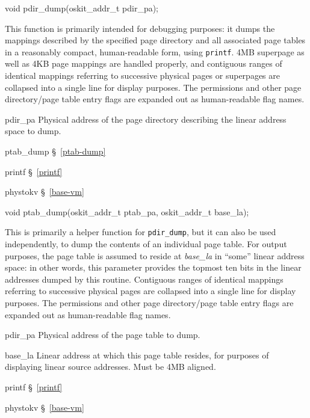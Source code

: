 \label{pdir-dump}
\begin{apisyn}

	\funcproto void pdir_dump(oskit_addr_t pdir_pa);
\end{apisyn}
\begin{apidesc}
	This function is primarily intended for debugging purposes:
	it dumps the mappings described by the specified page directory
	and all associated page tables
	in a reasonably compact, human-readable form,
	using {\tt printf}.
	4MB superpage as well as 4KB page mappings are handled properly,
	and contiguous ranges of identical mappings
	referring to successive physical pages or superpages
	are collapsed into a single line for display purposes.
	The permissions and other page directory/page table entry flags
	are expanded out as human-readable flag names.
\end{apidesc}
\begin{apiparm}
	\item[pdir_pa]
		Physical address of the page directory
		describing the linear address space to dump.
\end{apiparm}
\begin{apidep}
	\item[ptab_dump]	\S~\ref{ptab-dump}
	\item[printf]		\S~\ref{printf}
	\item[phystokv]		\S~\ref{base-vm}
\end{apidep}

\label{ptab-dump}
\begin{apisyn}

	\funcproto void ptab_dump(oskit_addr_t ptab_pa, oskit_addr_t base_la);
\end{apisyn}
\begin{apidesc}
	This is primarily a helper function for {\tt pdir_dump},
	but it can also be used independently,
	to dump the contents of an individual page table.
	For output purposes,
	the page table is assumed to reside at \emph{base_la}
	in ``some'' linear address space:
	in other words, this parameter provides the topmost ten bits
	in the linear addresses dumped by this routine.
	Contiguous ranges of identical mappings
	referring to successive physical pages
	are collapsed into a single line for display purposes.
	The permissions and other page directory/page table entry flags
	are expanded out as human-readable flag names.
\end{apidesc}
\begin{apiparm}
	\item[pdir_pa]
		Physical address of the page table to dump.
	\item[base_la]
		Linear address at which this page table resides,
		for purposes of displaying linear source addresses.
		Must be 4MB aligned.
\end{apiparm}
\begin{apidep}
	\item[printf]		\S~\ref{printf}
	\item[phystokv]		\S~\ref{base-vm}
\end{apidep}


